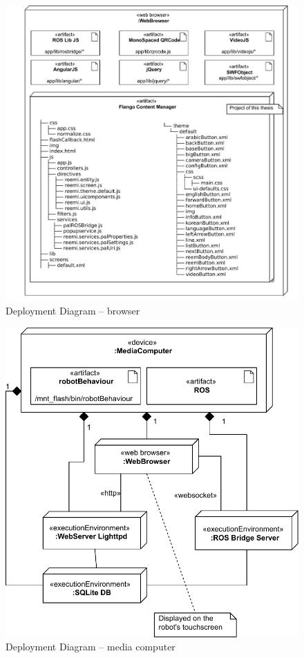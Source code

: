 \begin{figure}
    \centering
    \includegraphics{figures/design-deployment-browser.pdf}
    \caption{Deployment Diagram -- browser}
    \label{fig:deploy-browser}
\end{figure}

\begin{figure}[htb]
    \centering
    \includegraphics{figures/design-deployment-mediacomputer.pdf}
    \caption{Deployment Diagram -- media computer}
    \label{fig:deploy-media}
\end{figure}

